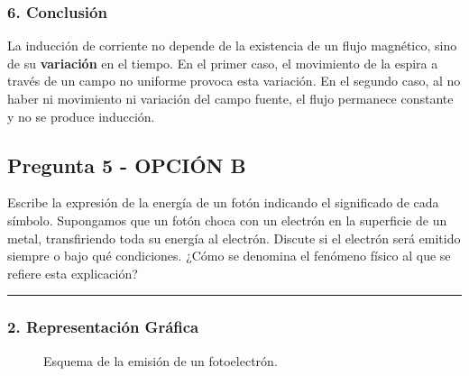 \subsubsection*{6. Conclusión}
\begin{cajaconclusion}
La inducción de corriente no depende de la existencia de un flujo magnético, sino de su \textbf{variación} en el tiempo. En el primer caso, el movimiento de la espira a través de un campo no uniforme provoca esta variación. En el segundo caso, al no haber ni movimiento ni variación del campo fuente, el flujo permanece constante y no se produce inducción.
\end{cajaconclusion}

\newpage

\subsection{Pregunta 5 - OPCIÓN B}
\label{subsec:5B_2015_jun_ord}

\begin{cajaenunciado}
Escribe la expresión de la energía de un fotón indicando el significado de cada símbolo. Supongamos que un fotón choca con un electrón en la superficie de un metal, transfiriendo toda su energía al electrón. Discute si el electrón será emitido siempre o bajo qué condiciones. ¿Cómo se denomina el fenómeno físico al que se refiere esta explicación?
\end{cajaenunciado}
\hrule

\subsubsection*{2. Representación Gráfica}
\begin{figure}[H]
    \centering
    \caption{Esquema de la emisión de un fotoelectrón.}
\end{figure}

